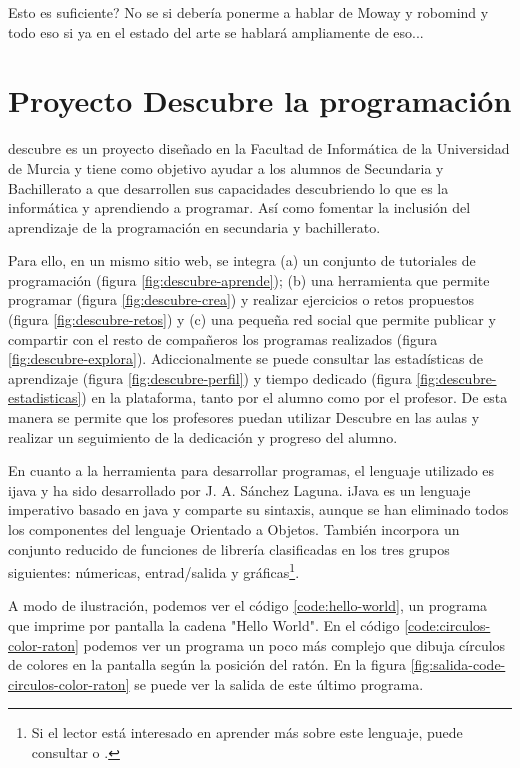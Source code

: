 {\color{red}
Esto es suficiente?
No se si debería ponerme a hablar de Moway y robomind y todo eso si ya en el estado del arte se hablará ampliamente de eso...
}



\section{Proyecto Descubre la programación}
\label{sec:descubre}

\Gls{descubre}\cite{descubre} es un proyecto diseñado en la Facultad de Informática de la Universidad de Murcia y tiene como objetivo ayudar a los alumnos de Secundaria y Bachillerato a que desarrollen sus capacidades descubriendo lo que es la informática y aprendiendo a programar. Así como fomentar la inclusión del aprendizaje de la programación en secundaria y bachillerato.

Para ello, en un mismo sitio web, se integra (a) un conjunto de tutoriales de programación (figura \ref{fig:descubre-aprende}); (b) una herramienta que permite programar (figura \ref{fig:descubre-crea}) y realizar ejercicios o retos propuestos (figura \ref{fig:descubre-retos}) y (c) una pequeña red social que permite publicar y compartir con el resto de compañeros los programas realizados (figura \ref{fig:descubre-explora}). Adiccionalmente se puede consultar las estadísticas de aprendizaje (figura \ref{fig:descubre-perfil}) y tiempo dedicado (figura \ref{fig:descubre-estadisticas}) en la plataforma, tanto por el alumno como por el profesor. De esta manera se permite que los profesores puedan utilizar Descubre en las aulas y realizar un seguimiento de la dedicación y progreso del alumno. 

En cuanto a la herramienta para desarrollar programas, el lenguaje utilizado es \gls{ijava}\cite{sanchez2009ijava} y ha sido desarrollado por J. A. Sánchez Laguna. iJava es un lenguaje imperativo basado en \Gls{java} y comparte su sintaxis, aunque se han eliminado todos los componentes del lenguaje Orientado a Objetos. También incorpora un conjunto reducido de funciones de librería clasificadas en los tres grupos siguientes: númericas, entrad/salida y gráficas\footnote{Si el lector está interesado en aprender más sobre este lenguaje, puede consultar \cite{sanchez2009ijava} o \cite{descubre-lenguaje}.}.

A modo de ilustración, podemos ver el código \ref{code:hello-world}, un programa que imprime por pantalla la cadena "Hello World". En el código \ref{code:circulos-color-raton} podemos ver un programa un poco más complejo que dibuja círculos de colores en la pantalla según la posición del ratón. En la figura \ref{fig:salida-code-circulos-color-raton} se puede ver la salida de este último programa.


